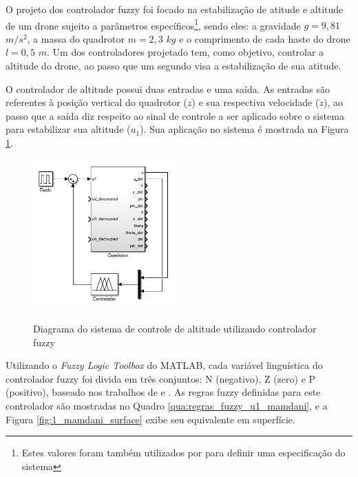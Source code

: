 O projeto dos controlador fuzzy foi focado na estabilização de atitude e altitude de um drone sujeito a parâmetros específicos\footnote{Estes valores foram também utilizados por  para definir uma especificação do sistema}, sendo eles: a gravidade $g=9,81$ $m/s^2$, a massa do quadrotor $m=2,3$ $kg$ e o comprimento de cada haste do drone $l=0,5$ $m$. Um dos controladores projetado tem, como objetivo, controlar a altitude do drone, ao passo que um segundo visa a estabilização de sua atitude.

O controlador de altitude possui duas entradas e uma saída. As entradas são referentes à posição vertical do quadrotor ($z$) e sua respectiva velocidade ($\dot{z}$), ao passo que a saída diz respeito ao sinal de controle a ser aplicado sobre o sistema para estabilizar sua altitude ($u_1$). Sua aplicação no sistema é mostrada na Figura \ref{fig:u1_mamdani_blocks}.

\begin{figure}[!htb]
    \centering
    \caption{Diagrama do sistema de controle de altitude utilizando controlador fuzzy}
    \includegraphics[width=0.5\textwidth]{./04-figuras/resultados/novos/simulink_printscreen_z}
    \label{fig:u1_mamdani_blocks}
\end{figure}

Utilizando o \textit{Fuzzy Logic Toolbox} do MATLAB, cada variável linguística do controlador fuzzy foi divida em três conjuntos: N (negativo), Z (zero) e P (positivo), baseado nos trabalhos de  e . As regras fuzzy definidas para este controlador são mostradas no Quadro \ref{qua:regras_fuzzy_u1_mamdani}, e a Figura \ref{fig:1_mamdani_surface} exibe seu equivalente em superfície.



